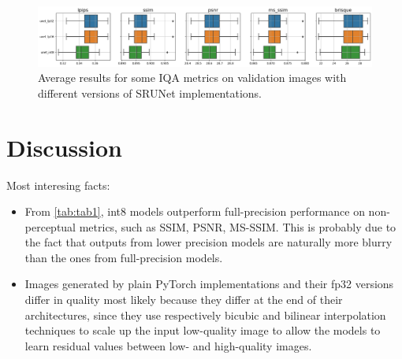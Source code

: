 \begin{figure}[h]
\includegraphics[width=1.0\textwidth]{static/2023_03_02_boxplots_metrics_quant_unet.png}
\caption{Average results for some IQA metrics on validation images with different versions of SRUNet implementations.}
\end{figure}

\section{Discussion}

Most interesing facts:
\begin{itemize}
\item{
  From \cref{tab:tab1}, int8 models outperform full-precision performance on non-perceptual metrics, such as SSIM, PSNR, MS-SSIM. This is probably due to the fact that outputs from lower precision models are naturally more blurry than the ones from full-precision models.
}

\item{
  Images generated by plain PyTorch implementations and their fp32 versions differ in quality most likely because they differ at the end of their architectures, since they use respectively bicubic and bilinear interpolation techniques to scale up the input low-quality image to allow the models to learn residual values between low- and high-quality images.
}
\end{itemize}
\pagebreak


